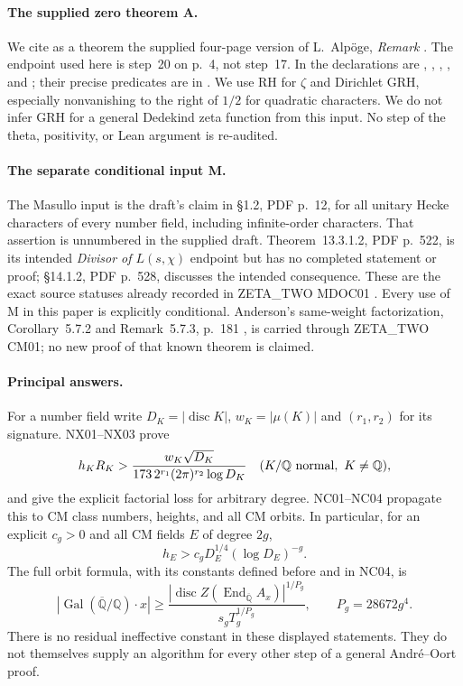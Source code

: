 \documentclass[11pt]{article}
\theoremstyle{remark}
\DeclareMathOperator{\Gal}{Gal}
\begin{document}
\paragraph{The supplied zero theorem A.}
We cite as a theorem the supplied four-page version of L.~Alp\"oge,
\emph{Remark} \cite{Alpoge}.  The endpoint used here is step~20 on
p.~4, not step~17.  In  the declarations are
, ,
,
, and
; their precise predicates
are in .  We use RH for $\zeta$ and
Dirichlet GRH, especially nonvanishing to the right of $1/2$ for
quadratic characters.  We do not infer GRH for a general Dedekind
zeta function from this input.  No step of the theta, positivity,
or Lean argument is re-audited.

\paragraph{The separate conditional input M.}
The Masullo input is the draft's claim in \S1.2, PDF p.~12, for all
unitary Hecke characters of every number field, including
infinite-order characters.  That assertion is unnumbered in the
supplied draft.  Theorem~13.3.1.2, PDF p.~522, is its intended
\emph{Divisor of $L(s,\chi)$} endpoint but has no completed statement
or proof; \S14.1.2, PDF p.~528, discusses the intended consequence.
These are the exact source statuses already recorded in ZETA\_TWO
MDOC01 \cite{Masullo,ZetaTwo}.  Every use of M in this paper is
explicitly conditional.  Anderson's same-weight factorization,
Corollary~5.7.2 and Remark~5.7.3, p.~181 \cite{Anderson1986}, is
carried through ZETA\_TWO CM01; no new proof of that known theorem
is claimed.

\paragraph{Principal answers.}
For a number field write $D_K=|\operatorname{disc}K|$,
$w_K=|\mu(K)|$ and $(r_1,r_2)$ for its signature.  NX01--NX03 prove
\[
 h_KR_K>
 \frac{w_K\sqrt{D_K}}
 {173\,2^{r_1}(2\pi)^{r_2}\log D_K}
 \quad(K/\mathbb Q\ \hbox{normal},\ K\ne\mathbb Q),
\]
and give the explicit factorial loss for arbitrary degree.
NC01--NC04 propagate this to CM class numbers, heights, and all CM
orbits.  In particular, for an explicit $c_g>0$ and all CM fields
$E$ of degree $2g$,
\[
 h_E>c_gD_E^{1/4}(\log D_E)^{-g}.
\]
The full orbit formula, with its constants defined before and in
NC04, is
\[
 |\Gal(\overline{\mathbb Q}/\mathbb Q)\cdot x|
 \ge \frac{|\operatorname{disc}Z(\operatorname{End}_{\overline{\mathbb Q}}A_x)|^{1/P_g}}
 {s_gT_g^{1/P_g}},\qquad P_g=28672g^4.
\]
There is no residual ineffective constant in these displayed
statements.  They do not themselves supply an algorithm for every
other step of a general Andr\'e--Oort proof.
\end{document}
